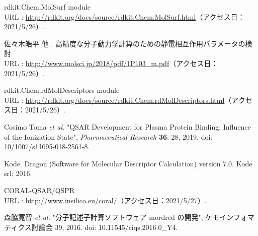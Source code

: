\documentclass[a4j,11pt]{jarticle}
\begin{document}
\begin{thebibliography}{50}
 rdkit.Chem.MolSurf module \\URL : \url{http://rdkit.org/docs/source/rdkit.Chem.MolSurf.html}（アクセス日：2021/5/26）.

 佐々木皓平 他 . 高精度な分子動力学計算のための静電相互作用パラメータの検討 \\URL : \url{http://www.molsci.jp/2018/pdf/1P103_m.pdf}（アクセス日：2021/5/26）.

 rdkit.Chem.rdMolDescriptors module \\URL : \url{http://rdkit.org/docs/source/rdkit.Chem.rdMolDescriptors.html}（アクセス日：2021/5/26）.

 Cosimo Toma \textit{et al.} "QSAR Development for Plasma Protein Binding: Influence of the Ionization State", \textit{Pharmaceutical Research} \textbf{36}: 28, 2019. doi: 10/1007/s11095-018-2561-8.

 Kode. Dragon (Software for Molecular Descriptor Calculation) version 7.0. Kode srl; 2016.

 CORAL-QSAR/QSPR \\URL : \url{http://www.insilico.eu/coral/}（アクセス日：2021/5/27）.

 森脇寛智 \textit{et al.} "分子記述子計算ソフトウェア mordred の開発", ケモインフォマティクス討論会 39, 2016. doi: 10.11545/ciqs.2016.0\_Y4.
\end{thebibliography}
\end{document}

